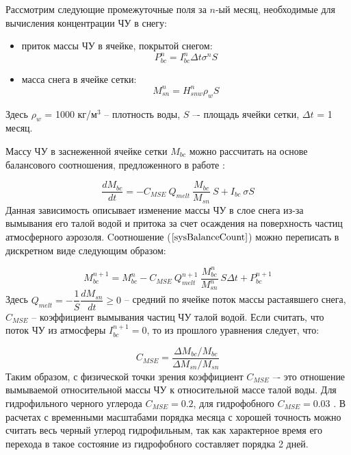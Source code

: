 \documentclass[a4paper, fontsize=14pt]{scrartcl}
\begin{document}
Рассмотрим следующие промежуточные поля за $n$-ый месяц, необходимые для вычисления концентрации ЧУ в снегу: 
\begin{itemize}
    \item приток массы ЧУ в ячейке, покрытой снегом:
    \begin{equation}
        P_{bc}^n = I_{bc}^n \Delta t \sigma^n S   \label{sys}
    \end{equation}
    \item масса снега в ячейке сетки:
    \begin{equation}
        M_{sn}^n = H_{snw}^n \rho_w S   \label{sys}
    \end{equation}
\end{itemize} 
Здесь $\rho_w$ = 1000 кг/м$^3$ -- плотность воды, $S$ –- площадь ячейки сетки, $\Delta t$ = 1 месяц.
    
Массу ЧУ в заснеженной ячейке сетки $M_{bc}$ можно рассчитать на основе балансового соотношения, предложенного в работе \cite{Flanner2007}:

\begin{equation}
    \dfrac{d M_{bc}}{d t} = - C_{MSE} ~ Q_{melt} ~ \dfrac{M_{bc}}{M_{sn}} ~ S + I_{bc} ~ \sigma S     \label{sysBalanceCount}
\end{equation}
Данная зависимость описывает изменение массы ЧУ в слое снега из-за вымывания его талой водой и притока за счет осаждения на поверхность частиц атмосферного аэрозоля. Cоотношение ($\ref{sysBalanceCount}$) можно переписать в дискретном виде следующим образом:

\begin{equation}
   M_{bc}^{n+1} = M_{bc}^n - C_{MSE} ~ Q_{melt}^{n+1} ~ \dfrac{M_{bc}^n}{M_{sn}^n} ~ S \Delta t + P_{bc}^{n+1}     \label{sysBalance}
\end{equation}
Здесь $Q_{melt} = - \dfrac{1}{S} \dfrac{dM_{sn}}{dt} \geq 0$ --  средний по ячейке поток массы растаявшего снега, $C_{MSE}$ -- коэффициент вымывания частиц ЧУ талой водой. Если считать, что поток ЧУ из атмосферы $I_{bc}^{n + 1} = 0$, то из прошлого уравнения следует, что:

\begin{equation}
   C_{MSE} = \dfrac{\Delta M_{bc} / M_{bc}}{\Delta M_{sn} / M_{sn}}     \label{sys}
\end{equation}
Таким образом, с физической точки зрения коэффициент $C_{MSE}$ –- это отношение вымываемой относительной массы ЧУ к относительной
массе талой воды. Для гидрофильного черного углерода $C_{MSE} = 0.2$, для гидрофобного $C_{MSE} = 0.03$ \cite{Flanner2007, Conway1996}. В расчетах с временными масштабами порядка месяца с хорошей точность можно считать весь черный углерод гидрофильным, так как характерное время его перехода в такое состояние из гидрофобного составляет порядка 2 дней.
\end{document}
